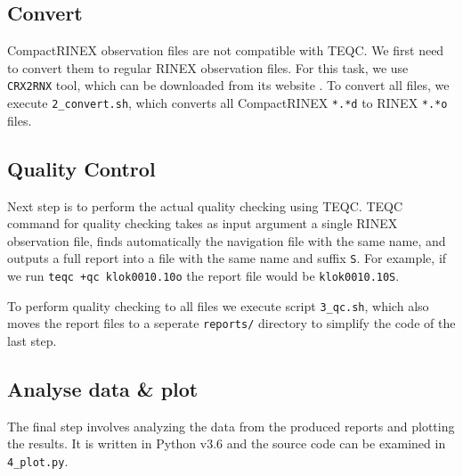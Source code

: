 \documentclass[
12pt, %
a4paper, %
oneside, %
headinclude,footinclude, %
BCOR5mm, %
]{article}
\begin{document}
\vspace*{25pt}


\subsection{Convert}

CompactRINEX observation files are not compatible with TEQC. We first need to convert them to regular RINEX observation files. For this task, we use \texttt{CRX2RNX} tool, which can be downloaded from its website \cite{crx2rnx}. To convert all files, we execute \texttt{2\_convert.sh}, which converts all CompactRINEX \texttt{*.*d} to RINEX \texttt{*.*o} files.

\vspace*{25pt}


\subsection{Quality Control}
Next step is to perform the actual quality checking using TEQC. TEQC command for quality checking takes as input argument a single RINEX observation file, finds automatically the navigation file with the same name, and outputs a full report into a file with the same name and suffix \texttt{S}. For example, if we run \texttt{teqc +qc klok0010.10o} the report file would be  \texttt{klok0010.10S}. 

To  perform quality checking to all files we execute script \texttt{3\_qc.sh}, which also moves the report files to a seperate \texttt{reports/} directory to simplify the code of the last step.

\vspace*{25pt}


\subsection{Analyse data \&  plot}
The final step involves analyzing the data from the produced reports and plotting the results. It is written in Python v3.6 and the source code can be examined in \texttt{4\_plot.py}.

\vspace*{25pt}

\vspace*{25pt}
\end{document}
